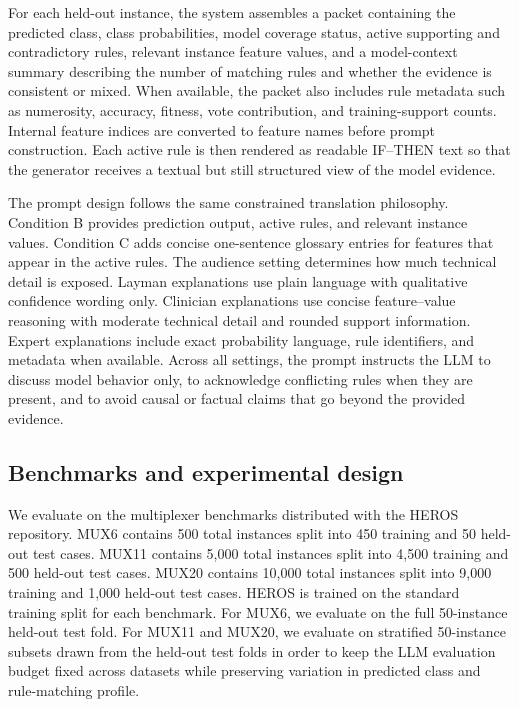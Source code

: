 \documentclass[sigconf,nonacm]{acmart}
\begin{document}
For each held-out instance, the system assembles a packet containing the predicted class, class probabilities, model coverage status, active supporting and contradictory rules, relevant instance feature values, and a model-context summary describing the number of matching rules and whether the evidence is consistent or mixed. When available, the packet also includes rule metadata such as numerosity, accuracy, fitness, vote contribution, and training-support counts. Internal feature indices are converted to feature names before prompt construction. Each active rule is then rendered as readable IF--THEN text so that the generator receives a textual but still structured view of the model evidence.

The prompt design follows the same constrained translation philosophy. Condition B provides prediction output, active rules, and relevant instance values. Condition C adds concise one-sentence glossary entries for features that appear in the active rules. The audience setting determines how much technical detail is exposed. Layman explanations use plain language with qualitative confidence wording only. Clinician explanations use concise feature--value reasoning with moderate technical detail and rounded support information. Expert explanations include exact probability language, rule identifiers, and metadata when available. Across all settings, the prompt instructs the LLM to discuss model behavior only, to acknowledge conflicting rules when they are present, and to avoid causal or factual claims that go beyond the provided evidence.

\subsection{Benchmarks and experimental design}
We evaluate on the multiplexer benchmarks distributed with the HEROS repository. MUX6 contains 500 total instances split into 450 training and 50 held-out test cases. MUX11 contains 5{,}000 total instances split into 4{,}500 training and 500 held-out test cases. MUX20 contains 10{,}000 total instances split into 9{,}000 training and 1{,}000 held-out test cases. HEROS is trained on the standard training split for each benchmark. For MUX6, we evaluate on the full 50-instance held-out test fold. For MUX11 and MUX20, we evaluate on stratified 50-instance subsets drawn from the held-out test folds in order to keep the LLM evaluation budget fixed across datasets while preserving variation in predicted class and rule-matching profile.
\end{document}
